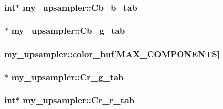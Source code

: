 \subsubsection[{Cb\+\_\+b\+\_\+tab}]{\setlength{\rightskip}{0pt plus 5cm}int$\ast$ my\+\_\+upsampler\+::\+Cb\+\_\+b\+\_\+tab}\label{structmy__upsampler_a0e7a2bfa2d928b6643497e092ac68205}
\hypertarget{structmy__upsampler_af9bf33b5de13df22004b7f0f99d8195d}{}
\subsubsection[{Cb\+\_\+g\+\_\+tab}]{$\ast$ my\+\_\+upsampler\+::\+Cb\+\_\+g\+\_\+tab}\label{structmy__upsampler_af9bf33b5de13df22004b7f0f99d8195d}
\hypertarget{structmy__upsampler_a72da5ad87430b974aeabce55c30eb653}{}
\subsubsection[{color\+\_\+buf}]{ my\+\_\+upsampler\+::color\+\_\+buf\mbox{[}{\bf M\+A\+X\+\_\+\+C\+O\+M\+P\+O\+N\+E\+N\+T\+S}\mbox{]}}\label{structmy__upsampler_a72da5ad87430b974aeabce55c30eb653}
\hypertarget{structmy__upsampler_a1a14abca6bd59cb35c4e3ee51f1ed8f5}{}
\subsubsection[{Cr\+\_\+g\+\_\+tab}]{$\ast$ my\+\_\+upsampler\+::\+Cr\+\_\+g\+\_\+tab}\label{structmy__upsampler_a1a14abca6bd59cb35c4e3ee51f1ed8f5}
\hypertarget{structmy__upsampler_a4f008494aac28cbf152a2bf05049dfca}{}
\subsubsection[{Cr\+\_\+r\+\_\+tab}]{\setlength{\rightskip}{0pt plus 5cm}int$\ast$ my\+\_\+upsampler\+::\+Cr\+\_\+r\+\_\+tab}\label{structmy__upsampler_a4f008494aac28cbf152a2bf05049dfca}
\hypertarget{structmy__upsampler_a4a82028e54b1f7e57b2c1f7d63290f65}{}
